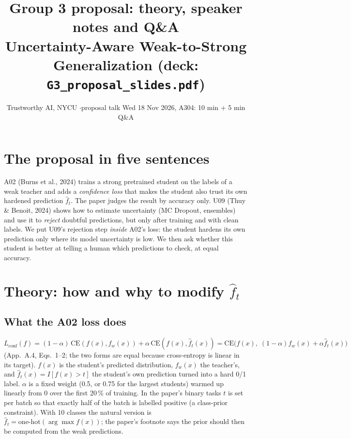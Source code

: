 \documentclass[10pt,a4paper]{article}
\title{\vspace{-1.5cm}Group 3 proposal: theory, speaker notes and Q\&A\\[0.2em]
\large Uncertainty-Aware Weak-to-Strong Generalization (deck: \texttt{G3\_proposal\_slides.pdf})}
\author{\normalsize Trustworthy AI, NYCU \quad$\cdot$\quad proposal talk Wed 18 Nov 2026, A304: 10 min + 5 min Q\&A}
\date{}
\newcommand{\CE}{\mathrm{CE}}
\newcommand{\fw}{f_w}
\newcommand{\fhat}{\hat f_t}
\begin{document}
\maketitle
\vspace{-1.2cm}

\section{The proposal in five sentences}
A02 (Burns et al., 2024) trains a strong pretrained student on the labels of a weak teacher and adds a
\emph{confidence loss} that makes the student also trust its own hardened prediction $\fhat$.
The paper judges the result by accuracy only.
U09 (Thuy \& Benoit, 2024) shows how to estimate uncertainty (MC Dropout, ensembles) and use it to
\emph{reject} doubtful predictions, but only after training and with clean labels.
We put U09's rejection step \emph{inside} A02's loss: the student hardens its own prediction only where its
model uncertainty is low.
We then ask whether this student is better at telling a human which predictions to check, at equal accuracy.

\section{Theory: how and why to modify $\fhat$}

\subsection{What the A02 loss does}
\[
L_{\text{conf}}(f)=(1-\alpha)\,\CE(f(x),\fw(x))+\alpha\,\CE(f(x),\fhat(x))
=\CE\big(f(x),\;(1-\alpha)\fw(x)+\alpha\fhat(x)\big)
\]
(App.\ A.4, Eqs.\ 1--2; the two forms are equal because cross-entropy is linear in its target).
$f(x)$ is the student's predicted distribution, $\fw(x)$ the teacher's, and
$\fhat(x)=I[f(x)>t]$ the student's own prediction turned into a hard 0/1 label.
$\alpha$ is a fixed weight (0.5, or 0.75 for the largest students) warmed up linearly from 0 over the first
20\,\% of training. In the paper's binary tasks $t$ is set per batch so that exactly half of the batch is
labelled positive (a class-prior constraint). With 10 classes the natural version is
$\fhat=\text{one-hot}(\arg\max f(x))$; the paper's footnote says the prior should then be computed from the
weak predictions.
\end{document}

